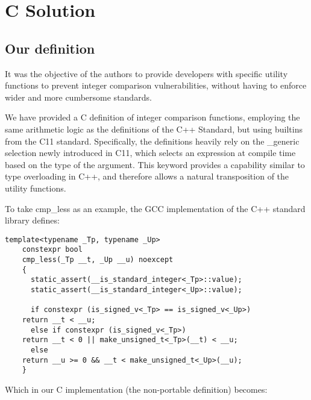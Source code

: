 \documentclass[11pt,letterpaper]{article}
\begin{document}
\blindtext
{}

\section{C Solution}
\label{sec:cimplementation}
\subsection{Our definition}
It was the objective of the authors to provide developers with specific utility functions to prevent integer comparison vulnerabilities, without having to enforce wider and more cumbersome standards. 

We have provided a C definition of integer comparison functions, employing the same arithmetic logic as the definitions of the C++ Standard, but using builtins from the C11 standard. Specifically, the definitions heavily rely on the \_generic selection newly introduced in C11, which selects an expression at compile time based on the type of the argument. This keyword provides a capability similar to type overloading in C++, and therefore allows a natural transposition of the utility functions.

To take cmp\_less as an example, the GCC implementation of the C++ standard library defines: 

\begin{lstlisting}[style=CppStyle]
  template<typename _Tp, typename _Up>
    constexpr bool
    cmp_less(_Tp __t, _Up __u) noexcept
    {
      static_assert(__is_standard_integer<_Tp>::value);
      static_assert(__is_standard_integer<_Up>::value);

      if constexpr (is_signed_v<_Tp> == is_signed_v<_Up>)
	return __t < __u;
      else if constexpr (is_signed_v<_Tp>)
	return __t < 0 || make_unsigned_t<_Tp>(__t) < __u;
      else
	return __u >= 0 && __t < make_unsigned_t<_Up>(__u);
    }
\end{lstlisting}

Which in our C implementation (the non-portable definition) becomes: 
\end{document}

